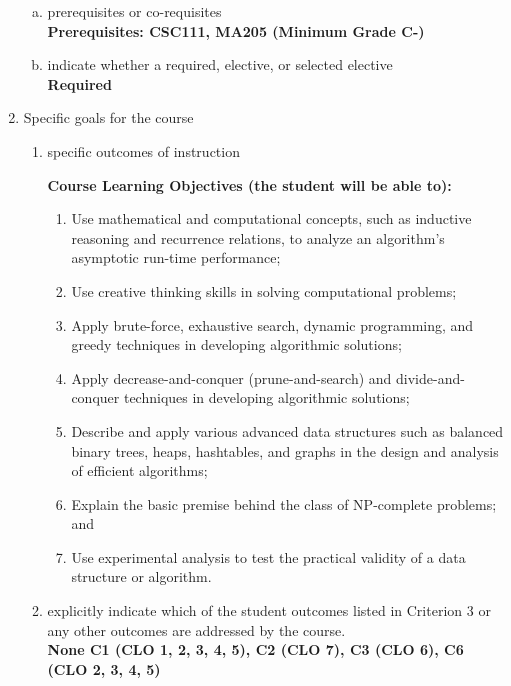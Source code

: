 \begin{enumerate}[1.]
\begin{enumerate}[a.]
\item prerequisites or co-requisites\\
  {\bfseries
    Prerequisites: CSC111, MA205 (Minimum Grade C-)
  }

\item indicate whether a required, elective, or selected elective\\ %
  {\bfseries
    Required
  }

\end{enumerate}

\item Specific goals for the course
\begin{enumerate}
\item specific outcomes of instruction\\ %
  {\bfseries
    Course Learning Objectives (the student will be able to):
\begin{enumerate}
\item Use mathematical and computational concepts, such as inductive reasoning and recurrence relations, to analyze an algorithm's asymptotic run-time performance;
\item Use creative thinking skills in solving computational problems;
\item Apply brute-force, exhaustive search, dynamic programming, and greedy techniques in developing algorithmic solutions;
\item Apply decrease-and-conquer (prune-and-search) and divide-and-conquer techniques in developing
algorithmic solutions;
\item Describe and apply various advanced data structures such as balanced binary trees, heaps,
hashtables, and graphs in the design and analysis of efficient algorithms;
\item Explain the basic premise behind the class of NP-complete problems; and
\item Use experimental analysis to test the practical validity of a data structure or algorithm.
\end{enumerate}
  }

\item explicitly indicate which of the student outcomes listed in Criterion 3 or any other outcomes are addressed by the course.\\
  {\bfseries
    None
    C1 (CLO 1, 2, 3, 4, 5),
    C2 (CLO 7),
    C3 (CLO 6),
    C6 (CLO 2, 3, 4, 5)
  }
\end{enumerate}


\end{enumerate}
